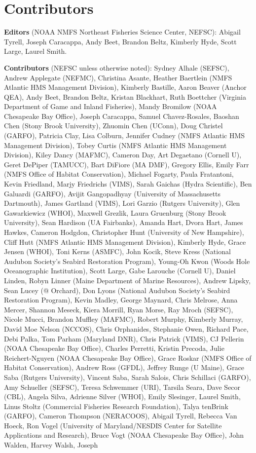 \documentclass[
  10pt,
]{article}
\begin{document}
\section{Contributors}\label{contributors}

\textbf{Editors} (NOAA NMFS Northeast Fisheries Science Center, NEFSC): Abigail Tyrell, Joseph Caracappa, Andy Beet, Brandon Beltz, Kimberly Hyde, Scott Large, Laurel Smith.

\textbf{Contributors} (NEFSC unless otherwise noted): Sydney Alhale (SEFSC), Andrew Applegate (NEFMC), Christina Asante, Heather Baertlein (NMFS Atlantic HMS Management Division), Kimberly Bastille, Aaron Beaver (Anchor QEA), Andy Beet, Brandon Beltz, Kristan Blackhart, Ruth Boettcher (Virginia Department of Game and Inland Fisheries), Mandy Bromilow (NOAA Chesapeake Bay Office), Joseph Caracappa, Samuel Chavez-Rosales, Baoshan Chen (Stony Brook University), Zhuomin Chen (UConn), Doug Christel (GARFO), Patricia Clay, Lisa Colburn, Jennifer Cudney (NMFS Atlantic HMS Management Division), Tobey Curtis (NMFS Atlantic HMS Management Division), Kiley Dancy (MAFMC), Cameron Day, Art Degaetano (Cornell U), Geret DePiper (TAMUCC), Bart DiFiore (MA DMF), Gregory Ellis, Emily Farr (NMFS Office of Habitat Conservation), Michael Fogarty, Paula Fratantoni, Kevin Friedland, Marjy Friedrichs (VIMS), Sarah Gaichas (Hydra Scientific), Ben Galuardi (GARFO), Avijit Gangopadhyay (University of Massachusetts Dartmouth), James Gartland (VIMS), Lori Garzio (Rutgers University), Glen Gawarkiewicz (WHOI), Maxwell Grezlik, Laura Gruenburg (Stony Brook University), Sean Hardison (UA Fairbanks), Amanda Hart, Dvora Hart, James Hawkes, Cameron Hodgdon, Christopher Hunt (University of New Hampshire), Cliff Hutt (NMFS Atlantic HMS Management Division), Kimberly Hyde, Grace Jensen (WHOI), Toni Kerns (ASMFC), John Kocik, Steve Kress (National Audubon Society's Seabird Restoration Program), Young-Oh Kwon (Woods Hole Oceanographic Institution), Scott Large, Gabe Larouche (Cornell U), Daniel Linden, Robyn Linner (Maine Department of Marine Resources), Andrew Lipsky, Sean Lucey (@ Orchard), Don Lyons (National Audubon Society's Seabird Restoration Program), Kevin Madley, George Maynard, Chris Melrose, Anna Mercer, Shannon Meseck, Kiera Morrill, Ryan Morse, Ray Mroch (SEFSC), Nicole Mucci, Brandon Muffley (MAFMC), Robert Murphy, Kimberly Murray, David Moe Nelson (NCCOS), Chris Orphanides, Stephanie Owen, Richard Pace, Debi Palka, Tom Parham (Maryland DNR), Chris Patrick (VIMS), CJ Pellerin (NOAA Chesapeake Bay Office), Charles Perretti, Kristin Precoda, Julie Reichert-Nguyen (NOAA Chesapeake Bay Office), Grace Roskar (NMFS Office of Habitat Conservation), Andrew Ross (GFDL), Jeffrey Runge (U Maine), Grace Saba (Rutgers University), Vincent Saba, Sarah Salois, Chris Schillaci (GARFO), Amy Schueller (SEFSC), Teresa Schwemmer (URI), Tarsila Seara, Dave Secor (CBL), Angela Silva, Adrienne Silver (WHOI), Emily Slesinger, Laurel Smith, Linus Stoltz (Commercial Fisheries Research Foundation), Talya tenBrink (GARFO), Cameron Thompson (NERACOOS), Abigail Tyrell, Rebecca Van Hoeck, Ron Vogel (University of Maryland/NESDIS Center for Satellite Applications and Research), Bruce Vogt (NOAA Chesapeake Bay Office), John Walden, Harvey Walsh, Joseph 
\end{document}
